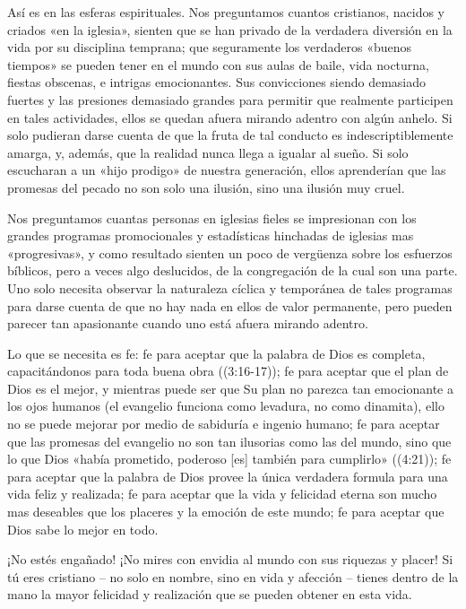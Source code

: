 \documentclass[12pt, twoside, openright]{book}
\begin{document}
Así es en las esferas espirituales. Nos preguntamos cuantos cristianos, nacidos y criados «en la iglesia», sienten que se han privado de la verdadera diversión en la vida por su disciplina temprana; que seguramente los verdaderos «buenos tiempos» se pueden tener en el mundo con sus aulas de baile, vida nocturna, fiestas obscenas, e intrigas emocionantes. Sus convicciones siendo demasiado fuertes y las presiones demasiado grandes para permitir que realmente participen en tales actividades, ellos se quedan afuera mirando adentro con algún anhelo. Si solo pudieran darse cuenta de que la fruta de tal conducto es indescriptiblemente amarga, y, además, que la realidad nunca llega a igualar al sueño. Si solo escucharan a un «hijo prodigo» de nuestra generación, ellos aprenderían que las promesas del pecado no son solo una ilusión, sino una ilusión muy cruel. 

Nos preguntamos cuantas personas en iglesias fieles se impresionan con los grandes programas promocionales y estadísticas hinchadas de iglesias mas «progresivas», y como resultado sienten un poco de vergüenza sobre los esfuerzos bíblicos, pero a veces algo deslucidos, de la congregación de la cual son una parte. Uno solo necesita observar la naturaleza cíclica y temporánea de tales programas para darse cuenta de que no hay nada en ellos de valor permanente, pero pueden parecer tan apasionante cuando uno está afuera mirando adentro.

Lo que se necesita es fe: fe para aceptar que la palabra de Dios es completa, capacitándonos para toda buena obra ((3:16-17)); fe para aceptar que el plan de Dios es el mejor, y mientras puede ser que Su plan no parezca tan emocionante a los ojos humanos (el evangelio funciona como levadura, no como dinamita), ello no se puede mejorar por medio de sabiduría e ingenio humano; fe para aceptar que las promesas del evangelio no son tan ilusorias como las del mundo, sino que lo que Dios «había prometido, poderoso [es] también para cumplirlo» ((4:21)); fe para aceptar que la palabra de Dios provee la única verdadera formula para una vida feliz y realizada; fe para aceptar que la vida y felicidad eterna son mucho mas deseables que los placeres y la emoción de este mundo; fe para aceptar que Dios sabe lo mejor en todo.

¡No estés engañado! ¡No mires con envidia al mundo con sus riquezas y placer! Si tú eres cristiano – no solo en nombre, sino en vida y afección – tienes dentro de la mano la mayor felicidad y realización que se pueden obtener en esta vida. 
\end{document}
